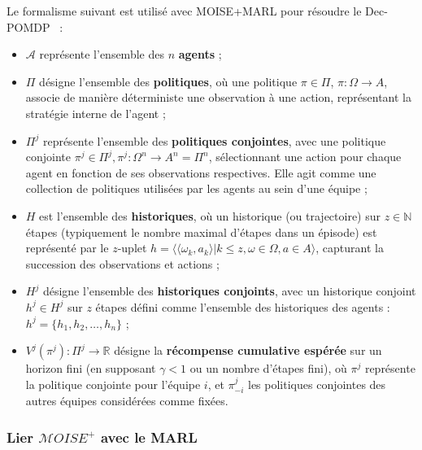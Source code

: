 Le formalisme suivant est utilisé avec MOISE+MARL pour résoudre le Dec-POMDP~\cite{Beynier2013,Albrecht2024} :
\begin{itemize}
    \item $\mathcal{A}$ représente l'ensemble des $n$ \textbf{agents} ;
    \item $\Pi$ désigne l'ensemble des \textbf{politiques}, où une politique $\pi \in \Pi$, $\pi: \Omega \rightarrow A$, associe de manière déterministe une observation à une action, représentant la stratégie interne de l'agent ;
    \item $\Pi^{j}$ représente l'ensemble des \textbf{politiques conjointes}, avec une politique conjointe $\pi^{j} \in \Pi^{j}, \pi^{j}: \Omega^n \rightarrow A^n = \Pi^n$, sélectionnant une action pour chaque agent en fonction de ses observations respectives. Elle agit comme une collection de politiques utilisées par les agents au sein d'une équipe ;
    \item $H$ est l'ensemble des \textbf{historiques}, où un historique (ou trajectoire) sur $z \in \mathbb{N}$ étapes (typiquement le nombre maximal d'étapes dans un épisode) est représenté par le $z$-uplet $h = \langle \langle \omega_{k}, a_{k}\rangle | k \leq z, \omega \in \Omega, a \in A\rangle$, capturant la succession des observations et actions ;
    \item $H^{j}$ désigne l'ensemble des \textbf{historiques conjoints}, avec un historique conjoint $h^{j} \in H^{j}$ sur $z$ étapes défini comme l'ensemble des historiques des agents : $h^{j} = \{h_1, h_2, \dots, h_n\}$ ;
    \item $V^{j}(\pi^{j}): \Pi^{j} \rightarrow \mathbb{R}$ désigne la \textbf{récompense cumulative espérée} sur un horizon fini (en supposant $\gamma < 1$ ou un nombre d'étapes fini), où $\pi^{j}$ représente la politique conjointe pour l'équipe $i$, et $\pi^{j}_{-i}$ les politiques conjointes des autres équipes considérées comme fixées.
\end{itemize}


\subsubsection{Lier $\mathcal{M}OISE^+$ avec le MARL}

